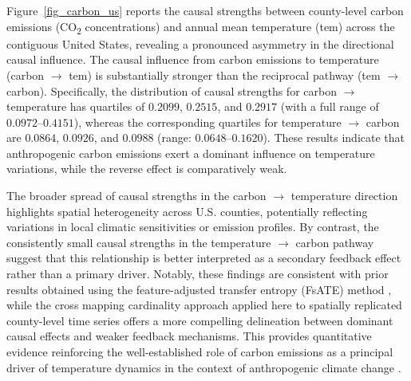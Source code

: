 \documentclass[authoryear,preprint,review,12pt]{elsarticle}
\begin{document}
Figure~\ref{fig_carbon_us} reports the causal strengths between county-level carbon emissions (CO\textsubscript{2} concentrations) and annual mean temperature (tem) across the contiguous United States, revealing a pronounced asymmetry in the directional causal influence. The causal influence from carbon emissions to temperature (carbon $\rightarrow$ tem) is substantially stronger than the reciprocal pathway (tem $\rightarrow$ carbon). Specifically, the distribution of causal strengths for carbon $\rightarrow$ temperature has quartiles of $0.2099$, $0.2515$, and $0.2917$ (with a full range of $0.0972$--$0.4151$), whereas the corresponding quartiles for temperature $\rightarrow$ carbon are $0.0864$, $0.0926$, and $0.0988$ (range: $0.0648$--$0.1620$). These results indicate that anthropogenic carbon emissions exert a dominant influence on temperature variations, while the reverse effect is comparatively weak.

The broader spread of causal strengths in the carbon $\rightarrow$ temperature direction highlights spatial heterogeneity across U.S. counties, potentially reflecting variations in local climatic sensitivities or emission profiles. By contrast, the consistently small causal strengths in the temperature $\rightarrow$ carbon pathway suggest that this relationship is better interpreted as a secondary feedback effect rather than a primary driver. Notably, these findings are consistent with prior results obtained using the feature-adjusted transfer entropy (FsATE) method \citep{gan2025urban_transfer_entropy}, while the cross mapping cardinality approach applied here to spatially replicated county-level time series offers a more compelling delineation between dominant causal effects and weaker feedback mechanisms. This provides quantitative evidence reinforcing the well-established role of carbon emissions as a principal driver of temperature dynamics in the context of anthropogenic climate change \citep{madden1980carbon_tem}.
\end{document}
